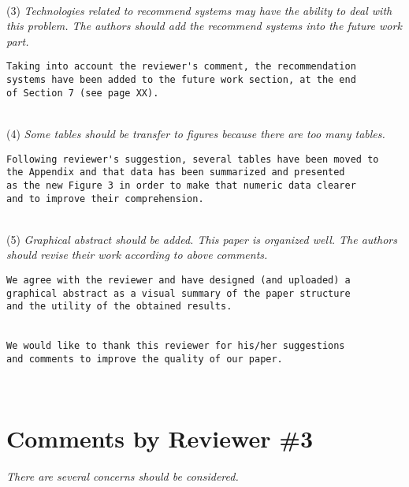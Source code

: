 \documentclass[preprint]{elsarticle}
\begin{document}
~\\
\noindent (3) \emph{Technologies related to recommend systems may have the ability to deal with this problem. The authors should add the recommend systems into the future work part. } 

\begin{verbatim}
Taking into account the reviewer's comment, the recommendation 
systems have been added to the future work section, at the end 
of Section 7 (see page XX).
\end{verbatim}

~\\
\noindent (4) \emph{Some tables should be transfer to figures because there are too many tables. } 

\begin{verbatim}
Following reviewer's suggestion, several tables have been moved to 
the Appendix and that data has been summarized and presented 
as the new Figure 3 in order to make that numeric data clearer 
and to improve their comprehension.
\end{verbatim}

~\\
\noindent (5) \emph{Graphical abstract should be added. This paper is organized well. The authors should revise their work according to above comments. } 

\begin{verbatim}
We agree with the reviewer and have designed (and uploaded) a 
graphical abstract as a visual summary of the paper structure 
and the utility of the obtained results.


We would like to thank this reviewer for his/her suggestions 
and comments to improve the quality of our paper.
\end{verbatim}

~\\


\section{Comments by Reviewer \#3}

\noindent \emph{There are several concerns should be considered.}\\
\end{document}
